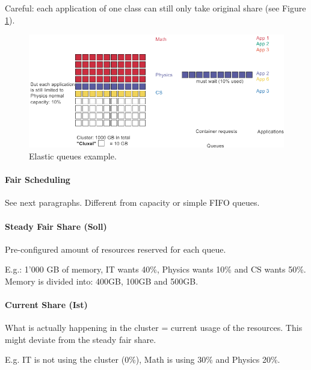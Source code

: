 Careful: each application of one class can still only take original share (see Figure \ref{fig:elastic}). %

\begin{figure}[h]
	\centering
	\includegraphics[scale=0.7]{images/4-elastic.PNG}
	\caption{Elastic queues example.}
	\label{fig:elastic}
\end{figure}

\paragraph{Fair Scheduling}
See next paragraphs. Different from capacity or simple FIFO queues.


\paragraph{Steady Fair Share (Soll)}
Pre-configured amount of resources reserved for each queue.

E.g.: 1'000 GB of memory, IT wants 40\%, Physics wants 10\% and CS wants 50\%. Memory is divided into: 400GB, 100GB and 500GB.

\paragraph{Current Share (Ist)}
What is actually happening in the cluster = current usage of the resources. This might deviate from the steady fair share.

E.g. IT is not using the cluster (0\%), Math is using 30\% and Physics 20\%.

